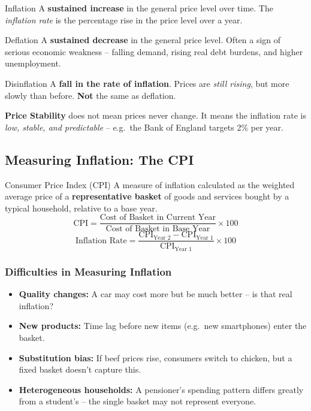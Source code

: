 \documentclass[11pt, a4paper, twoside]{book}
\begin{document}
\begin{keyterm}{Inflation}
A \textbf{sustained increase} in the general price level over time. The \emph{inflation rate} is the percentage rise in the price level over a year.
\end{keyterm}

\begin{keyterm}{Deflation}
A \textbf{sustained decrease} in the general price level. Often a sign of serious economic weakness -- falling demand, rising real debt burdens, and higher unemployment.
\end{keyterm}

\begin{keyterm}{Disinflation}
A \textbf{fall in the rate of inflation}. Prices are \emph{still rising}, but more slowly than before. \textbf{Not} the same as deflation.
\end{keyterm}

\begin{tcolorbox}[enhanced,colback=LightGold,colframe=GoldAccent,arc=0pt,boxrule=0.9pt,
  left=8pt,right=8pt,top=6pt,bottom=6pt]
\textbf{\color{NavyPrimary}Price Stability} does not mean prices never change. It means the inflation rate is \emph{low, stable, and predictable} -- e.g.\ the Bank of England targets 2\% per year.
\end{tcolorbox}

\subsection{Measuring Inflation: The CPI}

\begin{keyterm}{Consumer Price Index (CPI)}
A measure of inflation calculated as the weighted average price of a \textbf{representative basket} of goods and services bought by a typical household, relative to a base year.
\[
\text{CPI} = \frac{\text{Cost of Basket in Current Year}}{\text{Cost of Basket in Base Year}} \times 100
\]
\[
\text{Inflation Rate} = \frac{\text{CPI}_{\text{Year 2}} - \text{CPI}_{\text{Year 1}}}{\text{CPI}_{\text{Year 1}}} \times 100
\]
\end{keyterm}

\subsubsection{Difficulties in Measuring Inflation}

\begin{itemize}
  \item \textbf{Quality changes:} A car may cost more but be much better -- is that real inflation?
  \item \textbf{New products:} Time lag before new items (e.g.\ new smartphones) enter the basket.
  \item \textbf{Substitution bias:} If beef prices rise, consumers switch to chicken, but a fixed basket doesn't capture this.
  \item \textbf{Heterogeneous households:} A pensioner's spending pattern differs greatly from a student's -- the single basket may not represent everyone.
\end{itemize}
\end{document}
